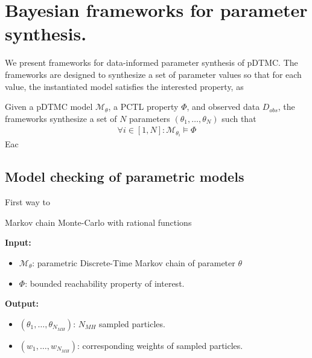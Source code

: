\chapter{Bayesian frameworks for parameter synthesis.}
We present frameworks for data-informed parameter synthesis of pDTMC. The frameworks are designed to
synthesize a set of parameter values so that for each value, the instantiated model satisfies the
interested property, as

Given a pDTMC model $\mathcal{M}_\theta$, a PCTL property $\Phi$, and observed data $D_{obs}$, the
frameworks synthesize a set of $N$ parameters $(\theta_1,\ldots,\theta_N)$ such that
\begin{align*}
      \forall i \in [1,N]: \mathcal{M}_{\theta_i} \models \Phi
\end{align*}
Eac

\section{Model checking of parametric models}
First way to
\begin{algorithm}[H]
      \caption{Markov chain Monte-Carlo with rational functions}
      \label{rf-mcmc-alg}
      \hspace*{\algorithmicindent} \textbf{Input:}
      \begin{itemize}
            \item $\mathcal{M}_\theta$: parametric Discrete-Time Markov chain of parameter $\theta$
            \item $\Phi$: bounded reachability property of interest.
      \end{itemize}
      \hspace*{\algorithmicindent} \textbf{Output:}
      \begin{itemize}
            \item $(\theta_1,\ldots,\theta_{N_{MH}})$: $N_{MH}$ sampled particles.
            \item $(w_1,\ldots,w_{N_{MH}})$: corresponding weights of sampled particles.
      \end{itemize}
      \begin{algorithmic}[1]

            \EndProcedure
      \end{algorithmic}
\end{algorithm}


